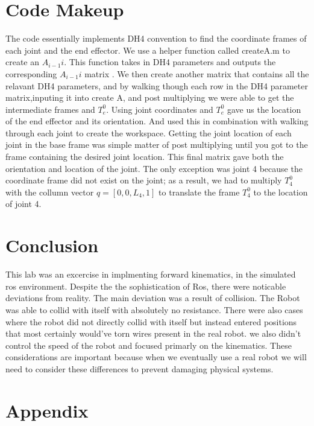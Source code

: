 \documentclass[12pt]{article}
\begin{document}
\section{Code Makeup}
\par{ The code essentially implements DH4 convention to find the coordinate frames of each joint and the end effector. We use a helper function called createA.m to create an $A_{i-1}{i}$. This function takes in DH4 parameters and outputs the corresponding $A_{i-1}{i}$ matrix . We then create another matrix that contains all the relavant DH4 parameters, and by walking though each row in the DH4 parameter matrix,inputing it into create A, and post multiplying we were able to get the intermediate frames and $T^{0}_{e}$. Using joint coordinates and $T^{0}_{e}$ gave us the location of the end effector and its orientation. And used this in combination with walking through each joint to create the workspace. Getting the joint location of each joint in the base frame was simple matter of post multiplying until you got to the frame containing the desired joint location. This final matrix gave both the orientation and location of the joint. The only exception was joint 4 because the coordinate frame did not exist on the joint; as a result, we had to multiply $T^{0}_{4}$ with the collumn vector $q=[0,0,L_{4},1]$ to translate the frame $T^{0}_{4}$  to the location of joint 4.
}

\section{Conclusion}
\par{This lab was an excercise in implmenting forward kinematics, in the simulated ros environment. Despite the the sophistication of Ros, there were noticable deviations from reality. The main deviation was a result of collision. The Robot was able to collid with itself with absolutely no resistance. There were also cases where the robot did not directly collid with itself but instead entered positions that most certainly would've torn wires present in the real robot. we also didn't control the speed of the robot and focused primarly on the kinematics. These considerations are important because when we eventually use a real robot we will need to consider these differences to prevent damaging physical systems.
}
\section{Appendix}
%
	
%
	
%
\end{document}

